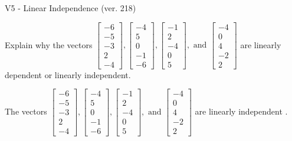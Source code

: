\begin{exercise}
  \begin{exerciseTitle}V5 - Linear Independence (ver. 218)\end{exerciseTitle}
  \begin{exerciseStatement}
    Explain why the vectors \(\left[\begin{array}{r}
-6 \\
-5 \\
-3 \\
2 \\
-4
\end{array}\right] , \left[\begin{array}{r}
-4 \\
5 \\
0 \\
-1 \\
-6
\end{array}\right] , \left[\begin{array}{r}
-1 \\
2 \\
-4 \\
0 \\
5
\end{array}\right] , \text{ and } \left[\begin{array}{r}
-4 \\
0 \\
4 \\
-2 \\
2
\end{array}\right]\) are linearly dependent or linearly independent.	


  \end{exerciseStatement}
  \begin{exerciseAnswer}
   The vectors \(\left[\begin{array}{r}
-6 \\
-5 \\
-3 \\
2 \\
-4
\end{array}\right] , \left[\begin{array}{r}
-4 \\
5 \\
0 \\
-1 \\
-6
\end{array}\right] , \left[\begin{array}{r}
-1 \\
2 \\
-4 \\
0 \\
5
\end{array}\right] , \text{ and } \left[\begin{array}{r}
-4 \\
0 \\
4 \\
-2 \\
2
\end{array}\right]\) are 
  	 linearly independent  .
  


  \end{exerciseAnswer}
\end{exercise}